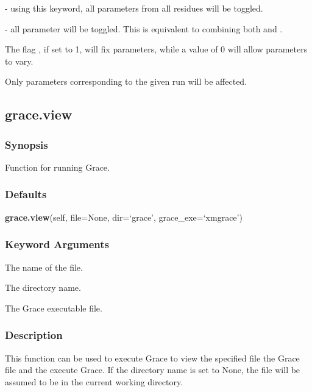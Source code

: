  - using this keyword, all parameters from all residues will be toggled.


 - all parameter will be toggled.  This is equivalent to combining both  and .


The flag , if set to 1, will fix parameters, while a value of 0 will allow parameters to vary.


Only parameters corresponding to the given run will be affected.




\newpage

\subsection{grace.view}


\subsubsection{Synopsis}

Function for running Grace.



\subsubsection{Defaults}

\textsf{\textbf{grace.view}(self, file=None, dir=`grace', grace\_exe=`xmgrace')}


\subsubsection{Keyword Arguments}

  The name of the file. 

  The directory name. 

  The Grace executable file. 




\subsubsection{Description}

This function can be used to execute Grace to view the specified file the Grace  file and the execute Grace. If the directory name is set to None, the file will be assumed to be in the current working directory.



